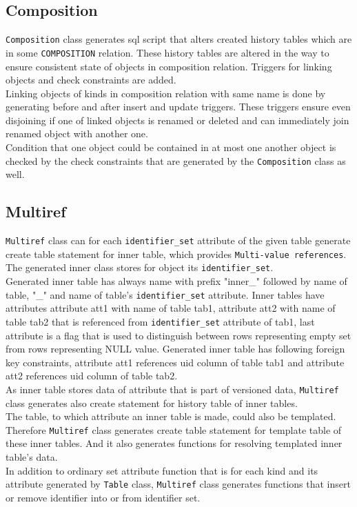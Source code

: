\documentclass[deska]{subfiles}
\begin{document}
\subsection{Composition}
{\tt Composition} class generates sql script that alters created history tables which are in some {\tt COMPOSITION} relation. These history tables are altered in the way to ensure consistent state of objects in composition relation. Triggers for linking objects and check constraints are added.\\
Linking objects of kinds in composition relation with same name is done by generating before and after insert and update triggers. These triggers ensure even disjoining if one of linked objects is renamed or deleted and can immediately join renamed object with another one.\\
Condition that one object could be contained in at most one another object is checked by the check constraints that are generated by the {\tt Composition} class as well.

\subsection{Multiref}
{\tt Multiref} class can for each {\tt identifier\_set} attribute of the given table generate create table statement for inner table, which provides {\tt Multi-value references}. The generated inner class stores for object its {\tt identifier\_set}.\\
Generated inner table has always name with prefix "inner\_" followed by name of table, "\_" and name of table's {\tt identifier\_set} attribute. Inner tables have attributes attribute att1 with name of table tab1, attribute att2 with name of table tab2 that is referenced from {\tt identifier\_set} attribute of tab1, last attribute is a flag that is used to distinguish between rows representing empty set from rows representing NULL value. Generated inner table has following foreign key constraints, attribute att1 references uid column of table tab1 and attribute att2 references uid column of table tab2.\\
As inner table stores data of attribute that is part of versioned data, {\tt Multiref} class generates also create statement for history table of inner tables.\\ 
The table, to which attribute an inner table is made, could also be templated. Therefore {\tt Multiref} class generates create table statement for template table of these inner tables. And it also generates functions for resolving templated inner table's data.\\
In addition to ordinary set attribute function that is for each kind and its attribute generated by {\tt Table} class, {\tt Multiref} class generates functions that insert or remove identifier into or from identifier set.
\end{document}
